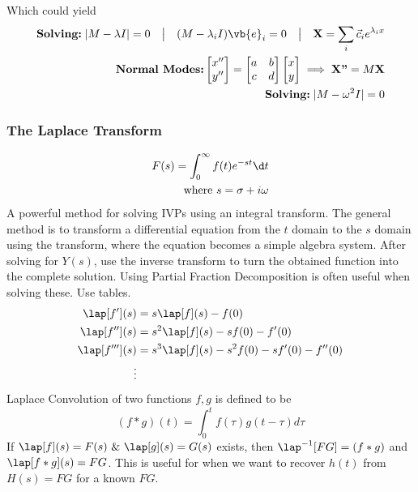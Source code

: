     Which could yield 
    \begin{align*}
        \textbf{Solving:}\; |M-\lambda I|=0\quad\big{|}\quad  (M-\lambda_iI)\vb{e}_i=0 \quad\big{|}\quad \textbf{X}=\sum_i\vec{c}_ie^{\lambda_ix}\\%
        \textbf{Normal Modes:}%
        \begin{bmatrix}
        x''\\
        y''
        \end{bmatrix}
        =
        \begin{bmatrix}
        a&b\\
        c&d\\
        \end{bmatrix}
        \begin{bmatrix}
        x\\
        y
        \end{bmatrix}\implies \textbf{X''}=M\textbf{X}\\
        \textbf{Solving:}\; |M-\omega^2 I|=0 %
    \end{align*}
\newpage
\subsubsection{The Laplace Transform}
    \begin{align*}
        F(s) =\int_0^\infty f(t) e^{-st} \d t \\ \text{ where } s = \sigma + i\omega
    \end{align*}
    A powerful method for solving IVPs using an integral transform. The general method is to transform a differential equation from the $t$ domain to the $s$ domain using the transform, where the equation becomes a simple algebra system. After solving for $Y(s)$, use the inverse transform to turn the obtained function into the complete solution.  Using Partial Fraction Decomposition is often useful when solving these. Use tables.
    \begin{align*}
        \lap[f'](s)&=s\lap[f](s)-f(0)
        \\
        \lap[f''](s)&=s^2\lap[f](s)-sf(0)-f'(0)
        \\
        \lap[f'''](s)&=s^3\lap[f](s)-s^2f(0)-sf'(0)-f''(0)
        \\
        \vdots
    \end{align*}
    Laplace Convolution of two functions $f,g$ is defined to be 
    \[
    (f*g)(t)=\int_0^tf(\tau)g(t-\tau)d\tau
    \]
    If $\lap[f](s)=F(s)~\&~\lap[g](s)=G(s)$ exists, then $\lap^{-1}[FG]=(f*g)$ and $\lap[f*g](s)=FG$. This is useful for when we want to recover $h(t)$ from $H(s)=FG$ for a known $FG$.
